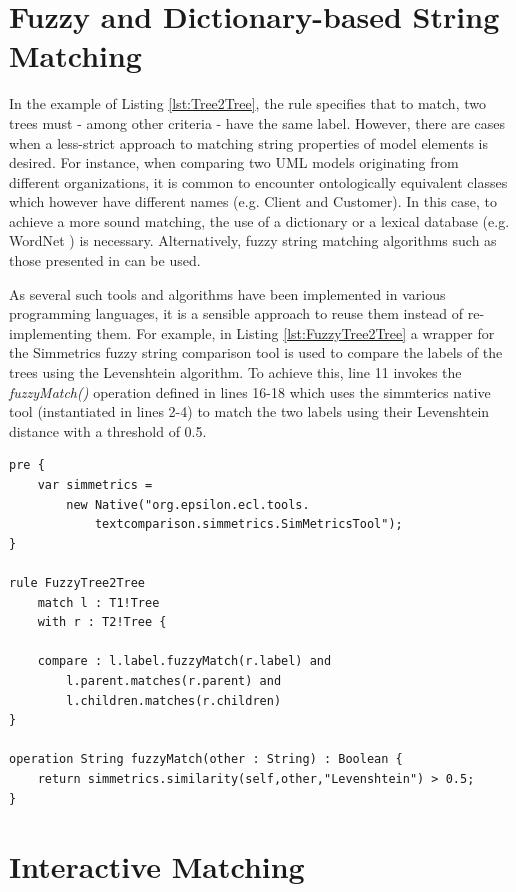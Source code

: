 \section{Fuzzy and Dictionary-based String Matching}
\label{sec:FuzzyComparison}

In the example of Listing \ref{lst:Tree2Tree}, the rule specifies that to match, two trees must - among other criteria - have the same label. However, there are cases when a less-strict approach to matching string properties of model elements is desired. For instance, when comparing two UML models originating from different organizations, it is common to encounter ontologically equivalent classes which however have different names (e.g. Client and Customer). In this case, to achieve a more sound matching, the use of a dictionary or a lexical database (e.g. WordNet \cite{Wordnet}) is necessary. Alternatively, fuzzy string matching algorithms such as those presented in \cite{FuzzyStringMatching} can be used.

As several such tools and algorithms have been implemented in various programming languages, it is a sensible approach to reuse them instead of re-implementing them. For example, in Listing \ref{lst:FuzzyTree2Tree} a wrapper for the Simmetrics \cite{Simmetrics} fuzzy string comparison tool is used to compare the labels of the trees using the Levenshtein \cite{Levenshtein} algorithm. To achieve this, line 11 invokes the \emph{fuzzyMatch()} operation defined in lines 16-18 which uses the simmterics native tool (instantiated in lines 2-4) to match the two labels using their Levenshtein distance with a threshold of 0.5.

\begin{lstlisting}[basicstyle=\ttfamily\footnotesize, flexiblecolumns=true, numbers=none, nolol=true, caption=The FuzzyTree2Tree rule, label=lst:FuzzyTree2Tree, language=ECL, numbers=left, tabsize=2]
pre {
	var simmetrics = 
		new Native("org.epsilon.ecl.tools.
			textcomparison.simmetrics.SimMetricsTool"); 
}

rule FuzzyTree2Tree 
	match l : T1!Tree
	with r : T2!Tree {
	
	compare : l.label.fuzzyMatch(r.label) and 
		l.parent.matches(r.parent) and
		l.children.matches(r.children)
}

operation String fuzzyMatch(other : String) : Boolean {
	return simmetrics.similarity(self,other,"Levenshtein") > 0.5;
}\end{lstlisting}

\section{Interactive Matching}
\label{sec:InteractiveModelComparison}

